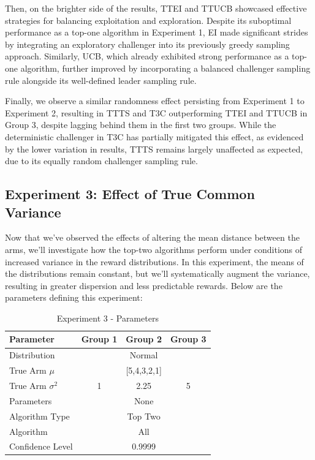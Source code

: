 \documentclass[a4paper, 12pt]{article}
\theoremstyle{definition}
\begin{document}
Then, on the brighter side of the results, TTEI and TTUCB showcased effective strategies for balancing exploitation and exploration. Despite its suboptimal performance as a top-one algorithm in Experiment 1, EI made significant strides by integrating an exploratory challenger into its previously greedy sampling approach. Similarly, UCB, which already exhibited strong performance as a top-one algorithm, further improved by incorporating a balanced challenger sampling rule alongside its well-defined leader sampling rule.

Finally, we observe a similar randomness effect persisting from Experiment 1 to Experiment 2, resulting in TTTS and T3C outperforming TTEI and TTUCB in Group 3, despite lagging behind them in the first two groups. While the deterministic challenger in T3C has partially mitigated this effect, as evidenced by the lower variation in results, TTTS remains largely unaffected as expected, due to its equally random challenger sampling rule.


\subsection{Experiment 3: Effect of True Common Variance}
Now that we've observed the effects of altering the mean distance between the arms, we'll investigate how the top-two algorithms perform under conditions of increased variance in the reward distributions. In this experiment, the means of the distributions remain constant, but we'll systematically augment the variance, resulting in greater dispersion and less predictable rewards. Below are the parameters defining this experiment:

\begin{table}[hbt!]
\centering
\begin{tabular}{lccc}
\hline
Parameter & Group 1 & Group 2 & Group 3 \\
\hline
Distribution & \multicolumn{3}{c}{Normal} \\
True Arm $\mu$ & \multicolumn{3}{c}{[5,4,3,2,1]} \\
True Arm $\sigma^2$ & 1 & 2.25 & 5 \\
Parameters & \multicolumn{3}{c}{None} \\
Algorithm Type & \multicolumn{3}{c}{Top Two} \\
Algorithm & \multicolumn{3}{c}{All} \\
Confidence Level & \multicolumn{3}{c}{0.9999} \\
\hline
\end{tabular}
\caption{Experiment 3 - Parameters}
\label{table:exp3_param}
\end{table}
\end{document}
